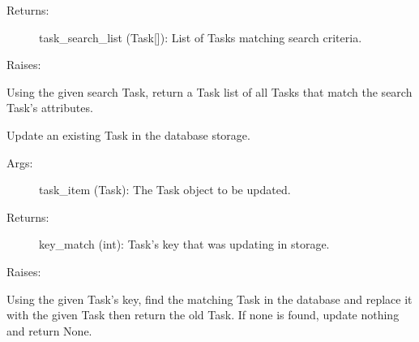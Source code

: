 \documentclass[letterpaper,10pt,english]{sphinxmanual}
\begin{document}
\begin{fulllineitems}
\begin{fulllineitems}
\begin{description}
\item[{Returns:}] \leavevmode
task\_search\_list (Task{[}{]}): List of Tasks matching search criteria.

\end{description}

Raises:

Using the given search Task, return a Task list of all Tasks that
match the search Task's attributes.

\end{fulllineitems}



\begin{fulllineitems}
\label{index:storage.SQLiteStorage.update}
Update an existing Task in the database storage.
\begin{description}
\item[{Args:}] \leavevmode
task\_item (Task): The Task object to be updated.

\item[{Returns:}] \leavevmode
key\_match (int): Task's key that was updating in storage.

\end{description}

Raises:

Using the given Task's key, find the matching Task in the database and
replace it with the given Task then return the old Task. If none is
found, update nothing and return None.

\end{fulllineitems}


\end{fulllineitems}


\end{document}

